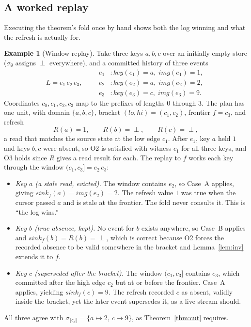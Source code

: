 \documentclass[sigconf,nonacm,10pt]{acmart}
\theoremstyle{plain}
\theoremstyle{definition}
\newtheorem{example}{Example}[section]
\newcommand{\den}[1]{\llbracket #1 \rrbracket}   %
\newcommand{\window}[2]{(#1,#2]}                 %
\newcommand{\keyof}{\mathit{key}}                %
\newcommand{\imgof}{\mathit{img}}                %
\newcommand{\sink}{\mathit{sink}}                %
\begin{document}
\subsection{A worked replay}\label{sec:theorem-example}

Executing the theorem's fold once by hand shows both the log winning 
and what the refresh is actually for.

\begin{example}[Window replay]\label{ex:replay}
Take three keys $a, b, c$ over an initially empty store
($\sigma_\emptyset$ assigns $\perp$ everywhere), and a committed
history of three events
\[
L = e_1\, e_2\, e_3,
\qquad
\begin{aligned}
e_1 &: \keyof(e_1) = a,\; \imgof(e_1) = 1,\\
e_2 &: \keyof(e_2) = a,\; \imgof(e_2) = 2,\\
e_3 &: \keyof(e_3) = c,\; \imgof(e_3) = 9.
\end{aligned}
\]
Coordinates $c_0, c_1, c_2, c_3$ map to the prefixes of lengths $0$
through $3$. The plan has one unit, with domain $\{a, b, c\}$, bracket
$(lo, hi) = (c_1, c_2)$, frontier $f = c_3$, and refresh
\[
R(a) = 1, \qquad R(b) = \perp, \qquad R(c) = \perp,
\]
a read that matches the source state at the low edge 
$c_1$. After $e_1$, key $a$
held $1$ and keys $b, c$ were absent, so O2 is satisfied with
witness $c_1$ for all three keys, and O3 holds since $R$ gives a
read result for each. The replay to $f$ works each key through the
window $\window{c_1}{c_3} = e_2\, e_3$:
\begin{itemize}
\item \emph{Key $a$ (a stale read, evicted).} The window contains
$e_2$, so Case~A applies, giving $\sink_f(a) = \imgof(e_2) = 2$. The
refresh value $1$ was true when the cursor passed $a$ and is stale
at the frontier. The fold never consults it. This is ``the log wins.''
\item \emph{Key $b$ (true absence, kept).} No event for $b$ exists
anywhere, so Case~B applies and $\sink_f(b) = R(b) = \perp$, which
is correct because O2 forces the recorded absence to be
valid somewhere in the bracket and Lemma~\ref{lem:inv} extends it
to $f$.
\item \emph{Key $c$ (superseded after the bracket).} The window
$\window{c_1}{c_3}$ contains $e_3$, which committed after the high
edge $c_2$ but at or before the frontier. Case~A applies,
yielding $\sink_f(c) = 9$. The refresh recorded $c$ as absent, validly inside the
bracket, yet the later event supersedes it, as a live
stream should.
\end{itemize}
All three agree with $\sigma_{\den{c_3}} = \{a \mapsto 2,\,
c \mapsto 9\}$, as Theorem~\ref{thm:cut} requires.
\end{example}
\end{document}
